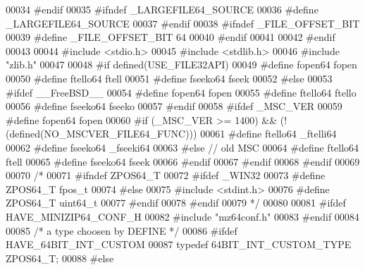 \begin{DoxyCode}
00034 \textcolor{preprocessor}{        #endif}
00035 \textcolor{preprocessor}{        #ifndef \_LARGEFILE64\_SOURCE}
00036 \textcolor{preprocessor}{                #define \_LARGEFILE64\_SOURCE}
00037 \textcolor{preprocessor}{        #endif}
00038 \textcolor{preprocessor}{        #ifndef \_FILE\_OFFSET\_BIT}
00039 \textcolor{preprocessor}{                #define \_FILE\_OFFSET\_BIT 64}
00040 \textcolor{preprocessor}{        #endif}
00041 
00042 \textcolor{preprocessor}{#endif}
00043 
00044 \textcolor{preprocessor}{#include <stdio.h>}
00045 \textcolor{preprocessor}{#include <stdlib.h>}
00046 \textcolor{preprocessor}{#include "zlib.h"}
00047 
00048 \textcolor{preprocessor}{#if defined(USE\_FILE32API)}
00049 \textcolor{preprocessor}{#define fopen64 fopen}
00050 \textcolor{preprocessor}{#define ftello64 ftell}
00051 \textcolor{preprocessor}{#define fseeko64 fseek}
00052 \textcolor{preprocessor}{#else}
00053 \textcolor{preprocessor}{#ifdef \_\_FreeBSD\_\_}
00054 \textcolor{preprocessor}{#define fopen64 fopen}
00055 \textcolor{preprocessor}{#define ftello64 ftello}
00056 \textcolor{preprocessor}{#define fseeko64 fseeko}
00057 \textcolor{preprocessor}{#endif}
00058 \textcolor{preprocessor}{#ifdef \_MSC\_VER}
00059 \textcolor{preprocessor}{ #define fopen64 fopen}
00060 \textcolor{preprocessor}{ #if (\_MSC\_VER >= 1400) && (!(defined(NO\_MSCVER\_FILE64\_FUNC)))}
00061 \textcolor{preprocessor}{  #define ftello64 \_ftelli64}
00062 \textcolor{preprocessor}{  #define fseeko64 \_fseeki64}
00063 \textcolor{preprocessor}{ #else // old MSC}
00064 \textcolor{preprocessor}{  #define ftello64 ftell}
00065 \textcolor{preprocessor}{  #define fseeko64 fseek}
00066 \textcolor{preprocessor}{ #endif}
00067 \textcolor{preprocessor}{#endif}
00068 \textcolor{preprocessor}{#endif}
00069 
00070 \textcolor{comment}{/*}
00071 \textcolor{comment}{#ifndef ZPOS64\_T}
00072 \textcolor{comment}{  #ifdef \_WIN32}
00073 \textcolor{comment}{                #define ZPOS64\_T fpos\_t}
00074 \textcolor{comment}{  #else}
00075 \textcolor{comment}{    #include <stdint.h>}
00076 \textcolor{comment}{    #define ZPOS64\_T uint64\_t}
00077 \textcolor{comment}{  #endif}
00078 \textcolor{comment}{#endif}
00079 \textcolor{comment}{*/}
00080 
00081 \textcolor{preprocessor}{#ifdef HAVE\_MINIZIP64\_CONF\_H}
00082 \textcolor{preprocessor}{#include "mz64conf.h"}
00083 \textcolor{preprocessor}{#endif}
00084 
00085 \textcolor{comment}{/* a type choosen by DEFINE */}
00086 \textcolor{preprocessor}{#ifdef HAVE\_64BIT\_INT\_CUSTOM}
00087 \textcolor{keyword}{typedef}  64BIT\_INT\_CUSTOM\_TYPE ZPOS64\_T;
00088 \textcolor{preprocessor}{#else}

\end{DoxyCode}
